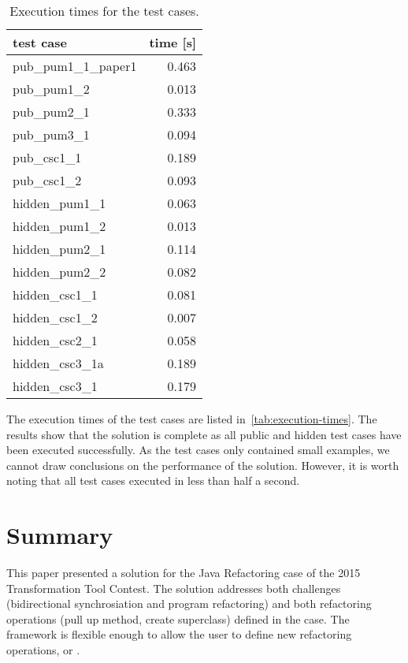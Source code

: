 \documentclass[submission,copyright,creativecommons]{eptcs}
\begin{document}
\begin{table}
\centering
\footnotesize
\begin{tabular}{| l | r |}
\hline
\bf test case & \bf time [s]\\\hline\hline
\sf pub\_pum1\_1\_paper1 & 0.463 \\\hline
\sf pub\_pum1\_2 & 0.013 \\\hline
\sf pub\_pum2\_1 & 0.333 \\\hline
\sf pub\_pum3\_1 & 0.094 \\\hline
\sf pub\_csc1\_1 & 0.189 \\\hline
\sf pub\_csc1\_2 & 0.093 \\\hline
\sf hidden\_pum1\_1 & 0.063 \\\hline
\sf hidden\_pum1\_2 & 0.013 \\\hline
\sf hidden\_pum2\_1 & 0.114 \\\hline
\sf hidden\_pum2\_2 & 0.082 \\\hline
\sf hidden\_csc1\_1 & 0.081 \\\hline
\sf hidden\_csc1\_2 & 0.007 \\\hline
\sf hidden\_csc2\_1 & 0.058 \\\hline
\sf hidden\_csc3\_1a & 0.189 \\\hline
\sf hidden\_csc3\_1 & 0.179 \\\hline

\end{tabular}\caption{Execution times for the test cases.}
\label{tab:execution-times}
\end{table}

The execution times of the test cases are listed in~\autoref{tab:execution-times}. The results show that the solution is complete as all public and hidden test cases have been executed successfully. As the test cases only contained small examples, we cannot draw conclusions on the performance of the solution. However, it is worth noting that all test cases executed in less than half a second.

\section{Summary}

This paper presented a solution for the Java Refactoring case of the 2015 Transformation Tool Contest. The solution addresses both challenges (bidirectional synchrosiation and program refactoring) and both refactoring operations (pull up method, create superclass) defined in the case. The framework is flexible enough to allow the user to define new refactoring operations, \eg {} or .
\end{document}
